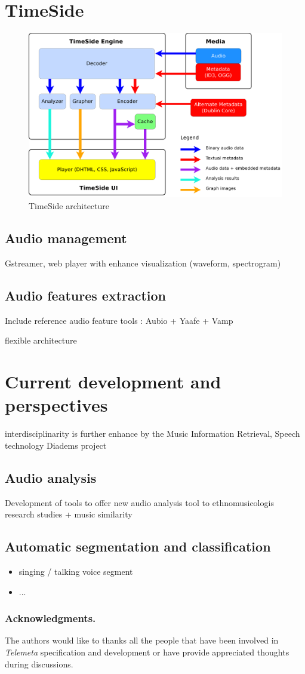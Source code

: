 \documentclass[runningheads,a4paper]{llncs}
\begin{document}
\section{TimeSide}

\begin{figure}[htbp]
  \centering
  \includegraphics[width=12cm]{img/timeside_schema.pdf}
  \caption{TimeSide architecture}
\end{figure}
\subsection{Audio management}
Gstreamer, web player
with enhance visualization (waveform, spectrogram)
\subsection{Audio features extraction}
Include reference audio feature tools : Aubio + Yaafe + Vamp

flexible architecture 

\section{Current development and perspectives}
interdisciplinarity is further enhance by the Music Information Retrieval, Speech technology 
Diadems project
\subsection{Audio analysis}
Development of tools  to offer new audio analysis tool to ethnomusicologis research studies 
+ music similarity

\subsection{Automatic segmentation and classification}
\begin{itemize}
\item singing / talking voice segment
\item ...
\end{itemize}


\subsubsection*{Acknowledgments.} 
The authors would like to thanks all the people that have been involved in \emph{Telemeta} specification and development or have provide appreciated thoughts during discussions.





\end{document}
